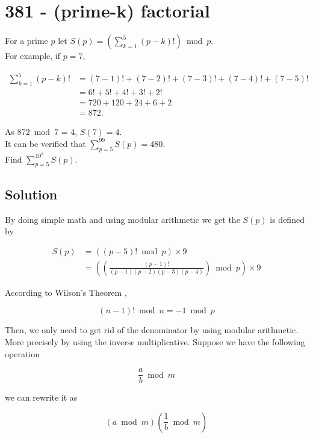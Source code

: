 \chapter*{381 - (prime-k) factorial}

   

For a prime $p$ let $S(p) = \left ( \sum_{k=1}^5(p-k)! \right ) \bmod{p}$.\\

For example, if $p=7$,

\begin{align*}
    \sum_{k=1}^5(p-k)! &= (7-1)! + (7-2)! + (7-3)! + (7-4)! + (7-5)!\\
    &= 6! + 5! + 4! + 3! + 2!\\
    &= 720+120+24+6+2\\
    &= 872.
\end{align*}


As $872 \bmod{7}$ = 4, $S(7) = 4$.\\

It can be verified that $\sum_{p=5}^{99} S(p) = 480$.\\

Find $\sum_{p=5}^{10^8} S(p)$.

\section*{Solution}

By doing simple math and using modular arithmetic we get the $S(p)$ is defined by

\begin{align*}
    S(p) &= \left ( (p-5)! \bmod p \right ) \times 9 \\
    &= \left ( \left ( \frac{(p-1)!}{(p-1)(p-2)(p-3)(p-4)} \right ) \bmod p \right ) \times 9
\end{align*}

According to Wilson's Theorem \cite{wilson_theorem},

$$
(n-1)! \bmod n = -1 \bmod p
$$

Then, we only need to get rid of the denominator by using modular arithmetic. More precisely by using the inverse multiplicative. Suppose we have the following operation

$$
\frac{a}{b} \bmod m
$$

we can rewrite it as

$$
\left ( a \bmod m \right ) \left ( \frac{1}{b} \bmod m \right )
$$

